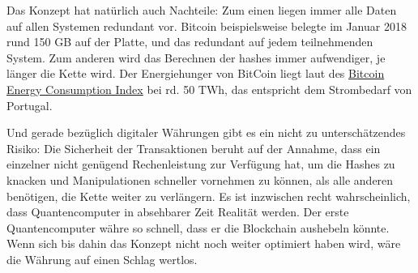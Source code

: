 {  Das Konzept hat natürlich auch Nachteile: Zum einen liegen immer alle Daten auf allen Systemen redundant vor. Bitcoin beispielsweise belegte im Januar 2018 rund 150 GB auf der Platte, und das redundant auf jedem teilnehmenden System. Zum anderen wird das Berechnen der hashes immer aufwendiger, je länger die Kette wird. Der Energiehunger von BitCoin liegt laut des \href{https://digiconomist.net/bitcoin-energy-consumption}{Bitcoin Energy Consumption Index} bei rd. 50 TWh, das entspricht dem Strombedarf von Portugal. 

  Und gerade bezüglich digitaler Währungen gibt es ein nicht zu unterschätzendes Risiko: Die Sicherheit der Transaktionen beruht auf der Annahme, dass ein einzelner nicht genügend Rechenleistung zur Verfügung hat, um die Hashes zu knacken und Manipulationen schneller vornehmen zu können, als alle anderen benötigen, die Kette weiter zu verlängern. Es ist inzwischen recht wahrscheinlich, dass Quantencomputer in absehbarer Zeit Realität werden. Der erste Quantencomputer währe so schnell, dass er die Blockchain aushebeln könnte. Wenn sich bis dahin das Konzept nicht noch weiter optimiert haben wird, wäre die Währung auf einen Schlag wertlos.
}
